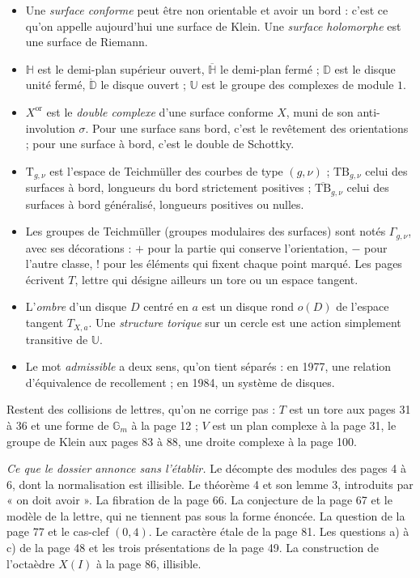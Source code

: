\documentclass[11pt,a4paper]{article}
\begin{document}
\begin{itemize}
  \item Une \emph{surface conforme} peut être non orientable et avoir un
  bord : c'est ce qu'on appelle aujourd'hui une surface de Klein. Une
  \emph{surface holomorphe} est une surface de Riemann.
  \item $\mathbb{H}$ est le demi-plan supérieur ouvert, $\overline{\mathbb{H}}$
  le demi-plan fermé ; $\mathbb{D}$ est le disque unité fermé,
  $\mathring{\mathbb{D}}$ le disque ouvert ; $\mathbb{U}$ est le groupe des
  complexes de module $1$.
  \item $X^{\mathrm{or}}$ est le \emph{double complexe} d'une surface conforme
  $X$, muni de son anti-involution $\sigma$. Pour une surface sans bord,
  c'est le revêtement des orientations ; pour une surface à bord, c'est le
  double de Schottky.
  \item $\mathrm{T}_{g,\nu}$ est l'espace de Teichmüller des courbes de type
  $(g,\nu)$ ; $\mathrm{TB}_{g,\nu}$ celui des surfaces à bord, longueurs du
  bord strictement positives ; $\overline{\mathrm{TB}}_{g,\nu}$ celui des
  surfaces à bord généralisé, longueurs positives ou nulles.
  \item Les groupes de Teichmüller (groupes modulaires des surfaces) sont
  notés $\Gamma_{g,\nu}$, avec ses décorations : $+$ pour la partie qui
  conserve l'orientation, $-$ pour l'autre classe, $!$ pour les éléments qui
  fixent chaque point marqué. Les pages écrivent $T$, lettre qui désigne
  ailleurs un tore ou un espace tangent.
  \item L'\emph{ombre} d'un disque $D$ centré en $a$ est un disque rond $o(D)$
  de l'espace tangent $T_{X,a}$. Une \emph{structure torique} sur un cercle
  est une action simplement transitive de $\mathbb{U}$.
  \item Le mot \emph{admissible} a deux sens, qu'on tient séparés : en 1977,
  une relation d'équivalence de recollement ; en 1984, un système de disques.
\end{itemize}

Restent des collisions de lettres, qu'on ne corrige pas : $T$ est un tore aux
pages 31 à 36 et une forme de $\mathbb{G}_m$ à la page 12 ; $V$ est un plan
complexe à la page 31, le groupe de Klein aux pages 83 à 88, une droite
complexe à la page 100.

\emph{Ce que le dossier annonce sans l'établir.} Le décompte des modules des
pages 4 à 6, dont la normalisation est illisible. Le théorème 4 et son
lemme 3, introduits par « on doit avoir ». La fibration de la page 66. La
conjecture de la page 67 et le modèle de la lettre, qui ne tiennent pas sous
la forme énoncée. La question de la page 77 et le cas-clef $(0,4)$. Le
caractère étale de la page 81. Les questions a) à c) de la page 48 et les
trois présentations de la page 49. La construction de l'octaèdre $X(I)$ à
la page 86, illisible.
\end{document}
